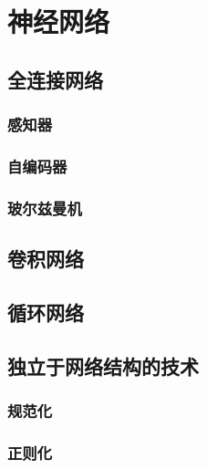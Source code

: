 \chapter{神经网络} %
\label{cha:神经网络}

\section{全连接网络} %
\label{sec:全连接网络}
\subsection{感知器} %
\label{sub:感知器}

\subsection{自编码器} %
\label{sub:自编码器}

\subsection{玻尔兹曼机} %
\label{sub:玻尔兹曼机}




\section{卷积网络} %
\label{sec:卷积网络}


\section{循环网络} %
\label{sec:循环网络}


\section{独立于网络结构的技术} %
\label{sec:独立于网络结构的技术}
\subsection{规范化} %
\label{sub:规范化}

\subsection{正则化} %
\label{sub:正则化}

